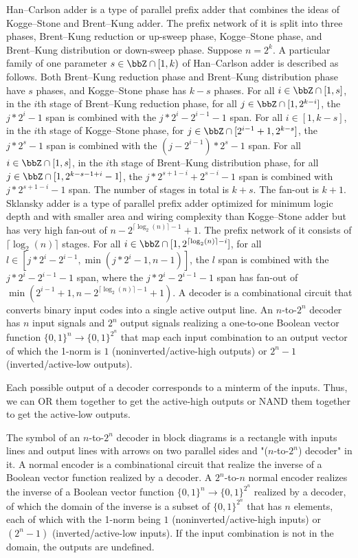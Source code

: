 \documentclass[a4paper,12pt]{report}
\begin{document}
Han–Carlson adder is a type of parallel prefix adder that combines the ideas of Kogge–Stone and Brent–Kung adder. The prefix network of it is split into three phases, Brent–Kung reduction or up-sweep phase, Kogge–Stone phase, and Brent–Kung distribution or down-sweep phase. Suppose $n=2^k$. A particular family of one parameter $s\in\bbZ\cap[1,k)$ of Han–Carlson adder is described as follows. Both Brent–Kung reduction phase and Brent–Kung distribution phase have $s$ phases, and Kogge–Stone phase has $k-s$ phases. For all $i\in\bbZ\cap[1,s]$, in the $i$th stage of Brent–Kung reduction phase, for all $j\in\bbZ\cap[1,2^{k-i}]$, the $j*2^i-1$ span is combined with the $j*2^i-2^{i-1}-1$ span. For all $i\in[1,k-s]$, in the $i$th stage of Kogge–Stone phase, for $j\in\bbZ\cap[2^{i-1}+1,2^{k-s}]$, the $j*2^s-1$ span is combined with the $(j-2^{i-1})*2^s-1$ span. For all $i\in\bbZ\cap[1,s]$, in the $i$th stage of Brent–Kung distribution phase, for all $j\in\bbZ\cap[1,2^{k-s-1+i}-1]$, the $j*2^{s+1-i}+2^{s-i}-1$ span is combined with $j*2^{s+1-i}-1$ span. The number of stages in total is $k+s$. The fan-out is $k+1$.
Sklansky adder is a type of parallel prefix adder optimized for minimum logic depth and with smaller area and wiring complexity than Kogge–Stone adder but has very high fan-out of $n-2^{\lceil\log_2(n)\rceil-1}+1$. The prefix network of it consists of $\lceil\log_2(n)\rceil$ stages. For all $i\in\bbZ\cap[1,2^{\lceil\log_2(n)\rceil-i}]$, for all $l\in[j*2^i-2^{i-1},\min(j*2^i-1,n-1)]$, the $l$ span is combined with the $j*2^i-2^{i-1}-1$ span, where the $j*2^i-2^{i-1}-1$ span has fan-out of $\min(2^{i-1}+1,n-2^{\lceil\log_2(n)\rceil-1}+1)$.
A decoder is a combinational circuit that converts binary input codes into a single active output line. An $n$-to-$2^n$ decoder has $n$ input signals and $2^n$ output signals realizing a one-to-one Boolean vector function $\{0,1\}^n\to\{0,1\}^{2^n}$ that map each input combination to an output vector of which the 1-norm is $1$ (noninverted/active-high outputs) or $2^n-1$ (inverted/active-low outputs).

Each possible output of a decoder corresponds to a minterm of the inputs. Thus, we can OR them together to get the active-high outputs or NAND them together to get the active-low outputs.

The symbol of an $n$-to-$2^n$ decoder in block diagrams is a rectangle with inputs lines and output lines with arrows on two parallel sides and "($n$-to-$2^n$) decoder" in it.
A normal encoder is a combinational circuit that realize the inverse of a Boolean vector function realized by a decoder. A $2^n$-to-$n$ normal encoder realizes the inverse of a Boolean vector function $\{0,1\}^n\to\{0,1\}^{2^n}$ realized by a decoder, of which the domain of the inverse is a subset of $\{0,1\}^{2^n}$ that has $n$ elements, each of which with the 1-norm being $1$ (noninverted/active-high inputs) or $(2^n-1)$ (inverted/active-low inputs). If the input combination is not in the domain, the outputs are undefined.
\end{document}
